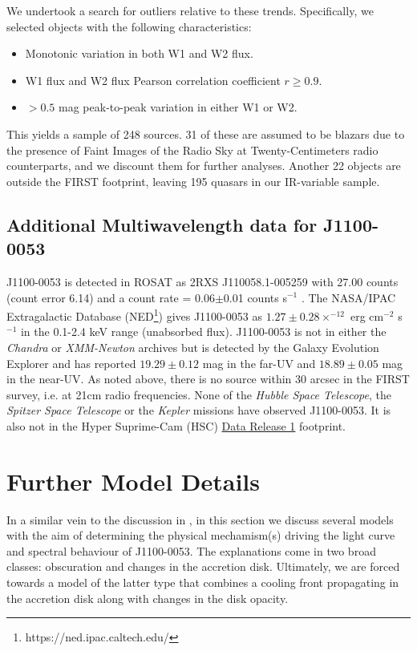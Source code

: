 \documentclass[11pt,a4paper]{article}
\begin{document}
We undertook a search for outliers relative to these
trends. Specifically, we selected objects with the following
characteristics:
\begin{itemize}
  \item Monotonic variation in both W1 and W2 flux.
  \item W1 flux and W2 flux Pearson correlation coefficient $r \geq0.9$.
  \item $>0.5$ mag peak-to-peak variation in either W1 or W2.
\end{itemize}
This yields a sample of 248 sources. 31 of these are assumed to be
blazars due to the presence of Faint Images of the Radio Sky at
Twenty-Centimeters \citep[FIRST; ][]{Becker1995} radio counterparts,
and we discount them for further analyses. Another 22 objects are
outside the FIRST footprint, leaving 195 quasars in our IR-variable
sample. %


\subsection{Additional Multiwavelength data for J1100-0053}
J1100-0053 is detected in ROSAT as 2RXS J110058.1-005259 with 27.00
counts (count error 6.14) and a count rate = 0.06$\pm$0.01 counts
s$^{-1}$ \cite{Boller2016}. The NASA/IPAC Extragalactic Database
(NED\footnote{https://ned.ipac.caltech.edu/}) gives J1100-0053 as
$1.27\pm0.28 \times^{-12}$ erg cm$^{-2}$ s$^{-1}$ in the 0.1-2.4 keV
range (unabsorbed flux). J1100-0053 is not in either the {\it Chandra}
or {\it XMM-Newton} archives but is detected by the Galaxy Evolution
Explorer \citep[GALEX; ][]{Martin2005, Morrissey2007} and has reported
$19.29\pm0.12$ mag in the far-UV and $18.89\pm0.05$ mag in the
near-UV. As noted above, there is no source within 30 arcsec in the
FIRST survey, i.e. at 21cm radio frequencies. None of the {\it Hubble
Space Telescope}, the {\it Spitzer Space Telescope} or the {\it
Kepler} missions have observed J1100-0053.  It is also not in the
Hyper Suprime-Cam (HSC)
\href{https://hsc-release.mtk.nao.ac.jp/doc/}{Data Release 1}
\citep{Aihara2017} footprint.



\section{Further Model Details}
In a similar vein to the discussion in \cite{Stern2018}, in this
section we discuss several models with the aim of determining the
physical mechamism(s) driving the light curve and spectral behaviour
of J1100-0053. The explanations come in two broad classes: obscuration
and changes in the accretion disk.  Ultimately, we are forced towards
a model of the latter type that combines a cooling front propagating
in the accretion disk along with changes in the disk opacity.
\end{document}
